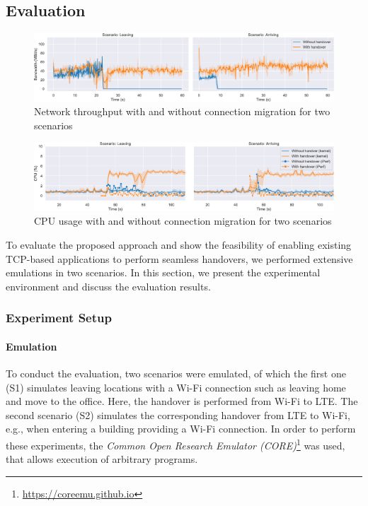 \subsection{Evaluation}

\begin{figure}[t]
    \centering
    \includegraphics[width=.9\textwidth]{figures/migration/wg_migration-network.pdf}
    \caption{Network throughput with and without connection migration for two scenarios}
    \label{fig:eval:mig:network}
\end{figure}
\begin{figure}[t]
    \centering
    \includegraphics[width=.9\textwidth]{figures/migration/wg_migration-cpu.pdf}
    \caption{CPU usage with and without connection migration for two scenarios}
    \label{fig:eval:mig:cpu}
\end{figure}

To evaluate the proposed approach and show the feasibility of enabling existing TCP-based applications to perform seamless handovers, we performed extensive emulations in two scenarios.
In this section, we present the experimental environment and discuss the evaluation results.

\subsubsection{Experiment Setup}
\paragraph{Emulation}
To conduct the evaluation, two scenarios were emulated, of which the first one (S1) simulates leaving locations with a Wi-Fi connection such as leaving home and move to the office.
Here, the handover is performed from Wi-Fi to LTE.
The second scenario (S2) simulates the corresponding handover from LTE to Wi-Fi, e.g., when entering a building providing a Wi-Fi connection.
In order to perform these experiments, the \emph{Common Open Research Emulator (CORE)}\footnote{\url{https://coreemu.github.io}} was used, that allows execution of arbitrary programs.

